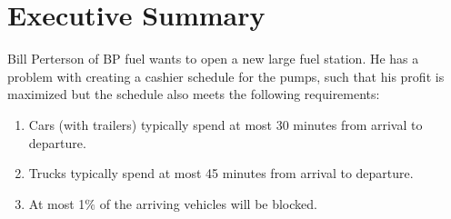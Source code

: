 \section{Executive Summary}
Bill Perterson of BP fuel wants to open a new large fuel station. He has a problem with creating a cashier schedule for the pumps, such that his profit is maximized but the schedule also meets the following requirements:
\begin{enumerate}
\item Cars (with  trailers) typically spend at most 30 minutes from arrival to departure.
\item Trucks typically spend at most 45 minutes from arrival to departure.
\item At most 1$\%$ of the arriving vehicles will be blocked.
\end{enumerate}